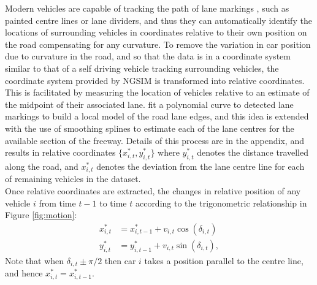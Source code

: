 \documentclass[12pt,a4paper]{article}\usepackage[]{graphicx}\usepackage[]{color}
\begin{document}
Modern vehicles are capable of tracking the path of lane markings \citep{Thuy2010}, such as painted centre lines or lane dividers, and thus they can automatically identify the locations of surrounding vehicles in coordinates relative to their own position on the road compensating for any curvature. To remove the variation in car position due to curvature in the road, and so that the data is in a coordinate system similar to that of a self driving vehicle tracking surrounding vehicles, the coordinate system provided by NGSIM is transformed into relative coordinates. This is facilitated by measuring the location of vehicles relative to an estimate of the midpoint of their associated lane. \citet{Woo2016a} fit a polynomial curve to detected lane markings to build a local model of the road lane edges, and this idea is extended with the use of smoothing splines to estimate each of the lane centres for the available section of the freeway. Details of this process are in the appendix, and results in relative coordinates $\{x^*_{i, t}, y^*_{i, t}\}$  where $y^*_{i, t}$ denotes the distance travelled along the road, and $x^*_{i, t}$ denotes the deviation from the lane centre line for each of remaining vehicles in the dataset.
\\

Once relative coordinates are extracted, the changes in relative position of any vehicle $i$ from time $t-1$ to time $t$ according to the trigonometric relationship in Figure \ref{fig:motion}:
\begin{align}
x^*_{i, t} &= x^*_{i, t-1} + v_{i, t} \cos(\delta_{i, t}) \label{xEq} \\
y^*_{i, t} &= y^*_{i, t-1} + v_{i, t} \sin(\delta_{i, t}) \label{yEq},
\end{align}
Note that when $\delta_{i, t} \pm \pi/2$ then car $i$ takes a position parallel to the centre line, and hence $x^*_{i, t} = x^*_{i, t-1}$.
\\
\end{document}
